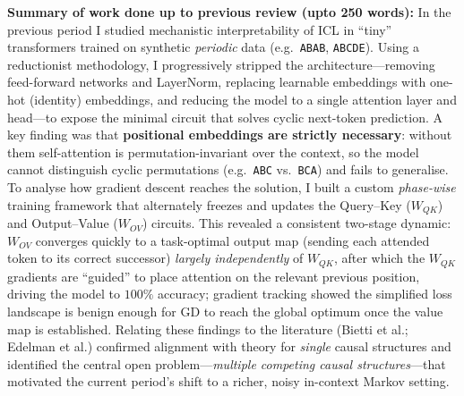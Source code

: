 \documentclass[12pt]{article}
\begin{document}
\medskip
\noindent\textbf{Summary of work done up to previous review (upto 250 words):}
In the previous period I studied mechanistic interpretability of ICL in ``tiny'' transformers
trained on synthetic \emph{periodic} data (e.g.\ \texttt{ABAB}, \texttt{ABCDE}). Using a
reductionist methodology, I progressively stripped the architecture---removing feed-forward
networks and LayerNorm, replacing learnable embeddings with one-hot (identity) embeddings, and
reducing the model to a single attention layer and head---to expose the minimal circuit that
solves cyclic next-token prediction. A key finding was that \textbf{positional embeddings are
strictly necessary}: without them self-attention is permutation-invariant over the context, so the
model cannot distinguish cyclic permutations (e.g.\ \texttt{ABC} vs.\ \texttt{BCA}) and fails to
generalise. To analyse how gradient descent reaches the solution, I built a custom
\emph{phase-wise} training framework that alternately freezes and updates the Query--Key
($W_{QK}$) and Output--Value ($W_{OV}$) circuits. This revealed a consistent two-stage dynamic:
$W_{OV}$ converges quickly to a task-optimal output map (sending each attended token to its correct
successor) \emph{largely independently} of $W_{QK}$, after which the $W_{QK}$ gradients are
``guided'' to place attention on the relevant previous position, driving the model to
$100\%$ accuracy; gradient tracking showed the simplified loss landscape is benign enough for GD to
reach the global optimum once the value map is established. Relating these findings to the
literature (Bietti et al.; Edelman et al.) confirmed alignment with theory for \emph{single}
causal structures and identified the central open problem---\emph{multiple competing causal
structures}---that motivated the current period's shift to a richer, noisy in-context Markov
setting.
\end{document}

